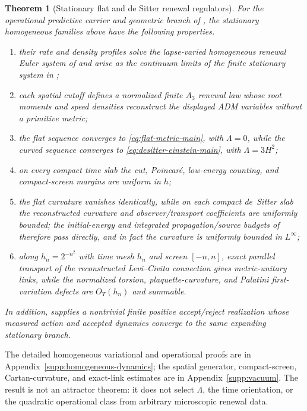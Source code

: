 \documentclass[11pt]{article}
\newtheorem{theorem}{Theorem}[section]
\numberwithin{equation}{section}
\theoremstyle{definition}
\theoremstyle{remark}
\begin{document}
\begin{theorem}[Stationary flat and de Sitter renewal regulators]
\label{mt:vacuum}
For the operational predictive carrier and geometric branch of
, the stationary homogeneous families above have
the following properties.
\begin{enumerate}[label=\textup{(\roman*)},leftmargin=2.8em]
\item their rate and density profiles solve the lapse-varied homogeneous renewal
      Euler system of  and arise as the
      continuum limits of the finite stationary system in
      ;
\item each spatial cutoff defines a normalized finite $A_3$ renewal law whose
      root moments and speed densities reconstruct the displayed ADM variables
      without a primitive metric;
\item the flat sequence converges to \eqref{eq:flat-metric-main}, with
      $\Lambda=0$, while the curved sequence converges to
      \eqref{eq:desitter-einstein-main}, with $\Lambda=3H^2$;
\item on every compact time slab the cut, Poincar\'e, low-energy counting, and
      compact-screen margins are uniform in $h$;
\item the flat curvature vanishes identically, while on each compact de~Sitter
      slab the reconstructed curvature and observer/transport coefficients are
      uniformly bounded; the initial-energy and integrated propagation/source
      budgets of  therefore pass directly,
      and in fact the curvature is uniformly bounded in $L^\infty$;
\item along $h_n=2^{-n^2}$ with time mesh $h_n$ and screen $[-n,n]$, exact
      parallel transport of the reconstructed Levi--Civita connection gives
      metric-unitary links, while the normalized torsion, plaquette-curvature,
      and Palatini first-variation defects are $O_T(h_n)$ and summable.
\end{enumerate}
In addition,  supplies a nontrivial
finite positive accept/reject realization whose measured action and accepted
dynamics converge to the same expanding stationary branch.
\end{theorem}

The detailed homogeneous variational and operational proofs are in
Appendix~\ref{supp:homogeneous-dynamics}; the spatial generator, compact-screen,
Cartan-curvature, and exact-link estimates are in Appendix~\ref{supp:vacuum}.
The result is not an attractor theorem: it does not select $\Lambda$, the time
orientation, or the quadratic operational class from arbitrary microscopic
renewal data.
\end{document}
